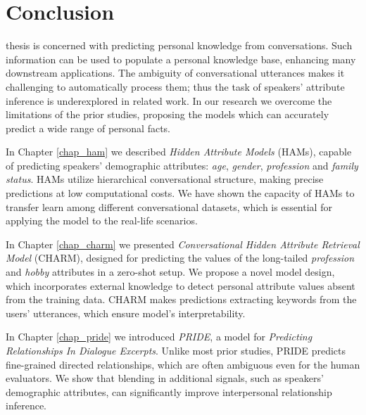 \chapter{Conclusion}
\label{chap_conclusion}

 thesis is concerned with predicting personal knowledge from conversations. Such information can be used to populate a personal knowledge base, enhancing many downstream applications. The ambiguity of conversational utterances makes it challenging to automatically process them; thus the task of speakers' attribute inference is underexplored in related work. In our research we overcome the limitations of the prior studies, proposing the models which can accurately predict a wide range of personal facts.


In Chapter \ref{chap_ham} we described \textit{Hidden Attribute Models} (HAMs), capable of predicting speakers' demographic attributes: \textit{age}, \textit{gender}, \textit{profession} and \textit{family status}. HAMs utilize hierarchical conversational structure, making precise predictions at low computational costs. We have shown the capacity of HAMs to transfer learn among different conversational datasets, which is essential for applying the model to the real-life scenarios.

In Chapter \ref{chap_charm} we presented \textit{Conversational Hidden Attribute Retrieval Model} (CHARM), designed for predicting the values of the long-tailed \textit{profession} and \textit{hobby} attributes in a zero-shot setup. We propose a novel model design, which incorporates external knowledge to detect personal attribute values absent from the training data. CHARM makes predictions extracting keywords from the users' utterances, which ensure model's interpretability. 

In Chapter \ref{chap_pride} we introduced \textit{PRIDE}, a model for \textit{Predicting Relationships In Dialogue Excerpts}. Unlike most prior studies, PRIDE predicts fine-grained directed relationships, which are often ambiguous even for the human evaluators. We show that blending in additional signals, such as speakers' demographic attributes, can significantly improve interpersonal relationship inference.

